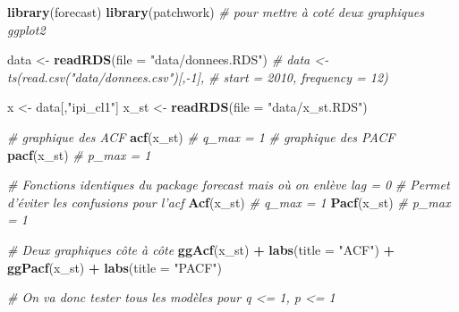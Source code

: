 \documentclass[french]{article}
\newenvironment{Shaded}{\begin{snugshade}}{\end{snugshade}}
\newcommand{\CommentTok}[1]{\textcolor[rgb]{0.56,0.35,0.01}{\textit{#1}}}
\newcommand{\DataTypeTok}[1]{\textcolor[rgb]{0.13,0.29,0.53}{#1}}
\newcommand{\KeywordTok}[1]{\textcolor[rgb]{0.13,0.29,0.53}{\textbf{#1}}}
\newcommand{\NormalTok}[1]{#1}
\newcommand{\OperatorTok}[1]{\textcolor[rgb]{0.81,0.36,0.00}{\textbf{#1}}}
\newcommand{\StringTok}[1]{\textcolor[rgb]{0.31,0.60,0.02}{#1}}
\begin{document}
\begin{Shaded}
\begin{Highlighting}[]
\KeywordTok{library}\NormalTok{(forecast)}
\KeywordTok{library}\NormalTok{(patchwork) }\CommentTok{# pour mettre à coté deux graphiques ggplot2}

\NormalTok{data <-}\StringTok{ }\KeywordTok{readRDS}\NormalTok{(}\DataTypeTok{file =} \StringTok{"data/donnees.RDS"}\NormalTok{)}
\CommentTok{# data <- ts(read.csv("data/donnees.csv")[,-1],}
\CommentTok{#          start = 2010, frequency = 12)}

\NormalTok{x <-}\StringTok{ }\NormalTok{data[,}\StringTok{"ipi_cl1"}\NormalTok{]}
\NormalTok{x_st <-}\StringTok{ }\KeywordTok{readRDS}\NormalTok{(}\DataTypeTok{file =} \StringTok{"data/x_st.RDS"}\NormalTok{)}

\CommentTok{# graphique des ACF}
\KeywordTok{acf}\NormalTok{(x_st) }\CommentTok{# q_max = 1}
\CommentTok{# graphique des PACF}
\KeywordTok{pacf}\NormalTok{(x_st) }\CommentTok{# p_max = 1}

\CommentTok{# Fonctions identiques du package forecast mais où on enlève lag = 0}
\CommentTok{# Permet d'éviter les confusions pour l'acf}
\KeywordTok{Acf}\NormalTok{(x_st) }\CommentTok{# q_max = 1}
\KeywordTok{Pacf}\NormalTok{(x_st) }\CommentTok{# p_max = 1}

\CommentTok{# Deux graphiques côte à côte}
\KeywordTok{ggAcf}\NormalTok{(x_st) }\OperatorTok{+}\StringTok{ }\KeywordTok{labs}\NormalTok{(}\DataTypeTok{title =} \StringTok{"ACF"}\NormalTok{) }\OperatorTok{+}
\StringTok{    }\KeywordTok{ggPacf}\NormalTok{(x_st) }\OperatorTok{+}\StringTok{ }\KeywordTok{labs}\NormalTok{(}\DataTypeTok{title =} \StringTok{"PACF"}\NormalTok{)}

\CommentTok{# On va donc tester tous les modèles pour q <= 1, p <= 1}



\end{Highlighting}
\end{Shaded}
\end{document}
